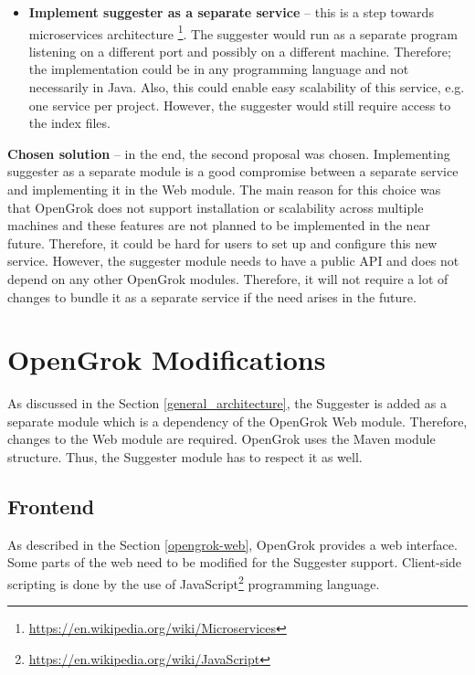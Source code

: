 \begin{itemize}
\begin{figure}[htbp]
    \label{opengrok_modules_changed_img}
    \end{figure}
    \item \textbf{Implement suggester as a separate service} – this is a step towards microservices architecture
    \footnote{\url{https://en.wikipedia.org/wiki/Microservices}}. The suggester would run as a separate program
    listening on a different port and possibly on a different machine. Therefore; the implementation could be in any
    programming language and not necessarily in Java. Also, this could enable easy scalability of this service,
    e.g. one service per project. However, the suggester would still require access to the index files.
\end{itemize}

\textbf{Chosen solution} – in the end, the second proposal was chosen. Implementing suggester as a separate module is a
good compromise between a separate service and implementing it in the Web module. The main reason for this choice was that
OpenGrok does not support installation or scalability across multiple machines and these features are not planned to be
implemented in the near future. Therefore, it could be hard for users to set up and configure this new service.
However, the suggester module needs to have a public API and does not depend on any other OpenGrok modules. Therefore, it
will not require a lot of changes to bundle it as a separate service if the need arises in the future.

\section{OpenGrok Modifications}
\label{opengrok_modifications}

As discussed in the Section \ref{general_architecture}, the Suggester is added as a separate module which is a dependency of the
OpenGrok Web module. Therefore, changes to the Web module are required. OpenGrok uses the Maven module structure.
Thus, the Suggester module has to respect it as well.

\subsection{Frontend}

As described in the Section \ref{opengrok-web}, OpenGrok provides a web interface. Some parts of the web need to be modified
for the Suggester support. Client-side scripting is done by the use of
JavaScript\footnote{\url{https://en.wikipedia.org/wiki/JavaScript}} programming language.

